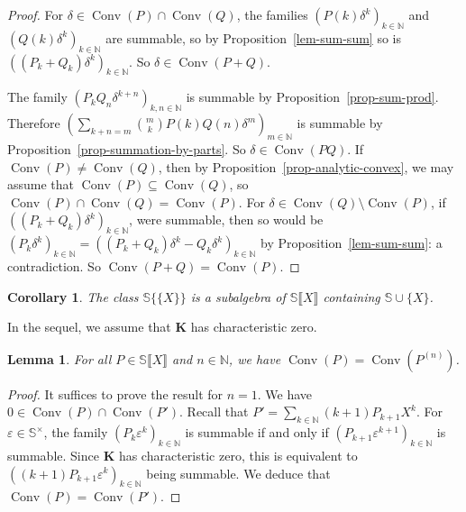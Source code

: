 \documentclass{article}
\newcommand{\tmop}[1]{\ensuremath{\operatorname{#1}}}
\newtheorem{corollary}[theorem]{Corollary}
\newtheorem{lemma}[theorem]{Lemma}
\theoremstyle{remark}\newtheorem*{convention*}{Convention}
\begin{document}
\begin{proof}
  For $\delta \in \tmop{Conv} (P) \cap \tmop{Conv} (Q)$, the families $(P (k)
  \delta^k)_{k \in \mathbb{N}}$ and $(Q (k) \delta^k)_{k \in \mathbb{N}}$ are
  summable, so by Proposition~\ref{lem-sum-sum} so is $((P_k + Q_k)
  \delta^k)_{k \in \mathbb{N}}$. So $\delta \in \tmop{Conv} (P + Q)$.
  
  The family $(P_k Q_n \delta^{k + n})_{k, n \in \mathbb{N}}$ is summable by
  Proposition~\ref{prop-sum-prod}. Therefore $(\sum_{k + n = m} \binom{m}{k} P
  (k) Q (n) \delta^m)_{m \in \mathbb{N}}$ is summable by
  Proposition~\ref{prop-summation-by-parts}. So $\delta \in \tmop{Conv}
  (PQ)$. If $\tmop{Conv} (P) \neq \tmop{Conv} (Q)$, then by
  Proposition~\ref{prop-analytic-convex}, we may assume that $\tmop{Conv} (P) \subseteq
  \tmop{Conv} (Q)$, so $\tmop{Conv} (P) \cap \tmop{Conv} (Q) = \tmop{Conv}
  (P)$. For $\delta \in \tmop{Conv} (Q) \setminus \tmop{Conv} (P)$, if $((P_k
  + Q_k) \delta^k)_{k \in \mathbb{N}}$, were summable, then so would be $(P_k
  \delta^k)_{k \in \mathbb{N}} = ((P_k + Q_k) \delta^k - Q_k \delta^k)_{k \in
  \mathbb{N}}$ by Proposition~\ref{lem-sum-sum}: a contradiction. So
  $\tmop{Conv} (P + Q) = \tmop{Conv} (P)$.
\end{proof}

\begin{corollary}
  The class $\mathbb{S} \{ \!\! \{X\} \!\! \}$ is a subalgebra of $\mathbb{S}
  \llbracket X \rrbracket$ containing $\mathbb{S} \cup \{X\}$.
\end{corollary}

In the sequel, we assume that $\mathbf{K}$ has characteristic zero.

\begin{lemma}
  \label{lem-derivative-power-series-radius}For all $P \in \mathbb{S}
  \llbracket X \rrbracket$ and $n \in \mathbb{N}$, we have $\tmop{Conv} (P) =
  \tmop{Conv} (P^{(n)})$.
\end{lemma}

\begin{proof}
  It suffices to prove the result for $n = 1$. We have $0 \in \tmop{Conv} (P)
  \cap \tmop{Conv} (P')$. Recall that $P' = \sum_{k \in \mathbb{N}} (k + 1)
  P_{k + 1} X^k$. For $\varepsilon \in \mathbb{S}^{\times}$, the family $(P_k
  \varepsilon^k)_{k \in \mathbb{N}}$ is summable if and only if $(P_{k + 1}
  \varepsilon^{k + 1})_{k \in \mathbb{N}}$ is summable. Since $\mathbf{K}$ has
  characteristic zero, this is equivalent to $((k + 1) P_{k + 1}
  \varepsilon^k)_{k \in \mathbb{N}}$ being summable. We deduce that
  $\tmop{Conv} (P) = \tmop{Conv} (P')$.
\end{proof}
\end{document}

